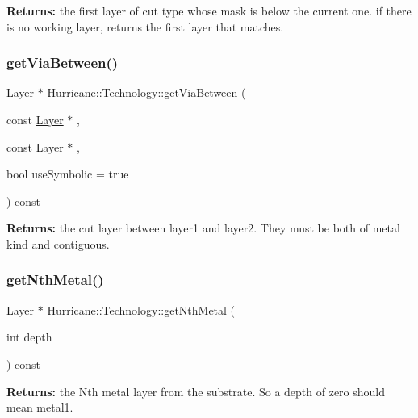 {\bfseries Returns\+:} the first layer of cut type whose mask is below the current one. if there is no working layer, returns the first layer that matches. \mbox{\label{classHurricane_1_1Technology_a8209708bc594a307ea39f15a39bbf196}} 
\subsubsection{\texorpdfstring{get\+Via\+Between()}{getViaBetween()}}
{\footnotesize\ttfamily \hyperlink{classHurricane_1_1Layer}{Layer} $\ast$ Hurricane\+::\+Technology\+::get\+Via\+Between (\begin{DoxyParamCaption}\item[{const \hyperlink{classHurricane_1_1Layer}{Layer} $\ast$}]{,  }\item[{const \hyperlink{classHurricane_1_1Layer}{Layer} $\ast$}]{,  }\item[{bool}]{use\+Symbolic = {\ttfamily true} }\end{DoxyParamCaption}) const}

{\bfseries Returns\+:} the cut layer between {\ttfamily layer1} and {\ttfamily layer2}. They must be both of metal kind and contiguous. \mbox{\label{classHurricane_1_1Technology_a81a3f3e479aeb686c61a2d0fa2931f3b}} 
\subsubsection{\texorpdfstring{get\+Nth\+Metal()}{getNthMetal()}}
{\footnotesize\ttfamily \hyperlink{classHurricane_1_1Layer}{Layer} $\ast$ Hurricane\+::\+Technology\+::get\+Nth\+Metal (\begin{DoxyParamCaption}\item[{int}]{depth }\end{DoxyParamCaption}) const}

{\bfseries Returns\+:} the {\ttfamily Nth} metal layer from the substrate. So a {\ttfamily depth} of zero should mean {\ttfamily metal1}. \mbox{\label{classHurricane_1_1Technology_a247b75d5cbb85198cea9e5e609304cd0}} 
